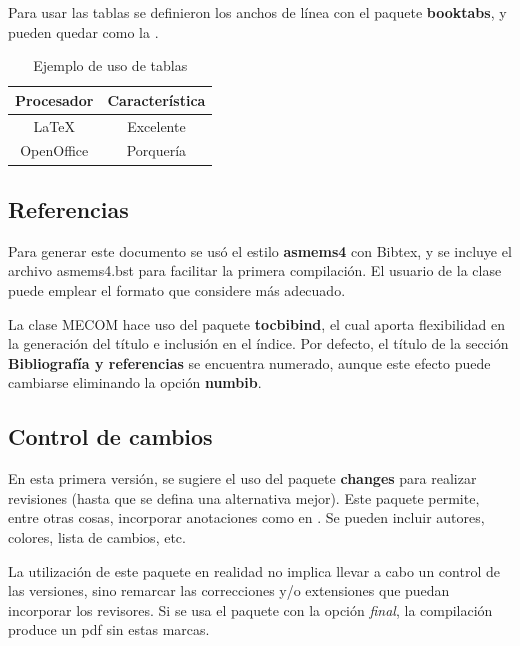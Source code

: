 \documentclass[a4paper,11pt,twoside]{MECOM}
\begin{document}
    
    \par
    Para usar las tablas se definieron los anchos de l\'inea con el paquete {\bf booktabs}, y pueden quedar como la .
    \begin{table}[ht]
        \centering
        \begin{tabular}{c c}
            \toprule
            \bf Procesador & \bf Caracter\'istica \\
            \midrule
            \LaTeX{} & Excelente \\
            OpenOffice & Porquer\'ia\\
            \bottomrule
        \end{tabular}
        \caption{Ejemplo de uso de tablas}
        \label{tab:prueba}
    \end{table}    
    


    
    \subsection{Referencias}
    Para generar este documento se us\'o el estilo {\bf asmems4} con Bibtex, y se incluye el archivo asmems4.bst para facilitar la primera compilaci\'on. El usuario de la clase puede emplear el formato que considere m\'as adecuado.
    \par
    La clase MECOM hace uso del paquete {\bf tocbibind}, el cual aporta flexibilidad en la generaci\'on del t\'itulo e inclusi\'on en el \'indice. Por defecto, el t\'itulo de la secci\'on {\bf Bibliograf\'ia y referencias} se encuentra numerado, aunque este efecto puede cambiarse eliminando la opci\'on {\bf numbib}.
    
    
    
    \subsection{Control de cambios}
    En esta primera versi\'on, se sugiere el uso del paquete {\bf changes} para realizar revisiones (hasta que se defina una alternativa mejor). Este paquete permite, entre otras cosas, incorporar anotaciones como en . Se pueden incluir autores, colores, lista de cambios, etc.
    \par
    La utilizaci\'on de este paquete en realidad no implica llevar a cabo un control de las versiones, sino remarcar las correcciones y/o extensiones que puedan incorporar los revisores. Si se usa el paquete con la opci\'on \emph{final}, la compilaci\'on produce un pdf sin estas marcas.
    
\end{document}
